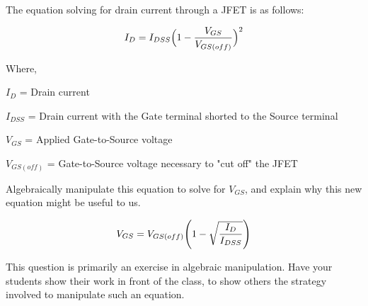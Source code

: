 

The equation solving for drain current through a JFET is as follows:

$$I_D = I_{DSS}\Bigl(1 - {V_{GS} \over V_{GS(off)}}\Bigr)^2$$

\noindent
Where,

$I_D$ = Drain current

$I_{DSS}$ = Drain current with the Gate terminal shorted to the Source terminal

$V_{GS}$ = Applied Gate-to-Source voltage

$V_{GS(off)}$ = Gate-to-Source voltage necessary to "cut off" the JFET

\vskip 10pt

Algebraically manipulate this equation to solve for $V_{GS}$, and explain why this new equation might be useful to us.







$$V_{GS} = V_{GS(off)}\Biggl( 1 - \sqrt{I_D \over I_{DSS}} \Biggr)$$







This question is primarily an exercise in algebraic manipulation.  Have your students show their work in front of the class, to show others the strategy involved to manipulate such an equation.




